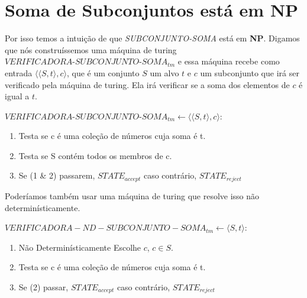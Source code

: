 \documentclass[12pt, a4paper]{article}
\begin{document}
\section{Soma de Subconjuntos está em \textbf{NP}}

Por isso temos a intuição de que \textit{SUBCONJUNTO-SOMA} está em \textbf{NP}. Digamos que nós construíssemos uma máquina de turing $\textit{VERIFICADORA-SUBCONJUNTO-SOMA}_{tm}$ e essa máquina recebe como entrada $\langle \langle S, t \rangle , c \rangle$, que é um conjunto $S$ um alvo $t$ e $c$ um subconjunto que irá ser verificado pela máquina de turing. Ela irá verificar se a soma dos elementos de $c$ é igual a $t$.

$\textit{VERIFICADORA-SUBCONJUNTO-SOMA}_{tm} \leftarrow \langle \langle S, t \rangle , c \rangle$:

\begin{enumerate}
  \item Testa se c é uma coleção de números cuja soma é t.
  \item Testa se S contém todos os membros de c.
  \item Se (1 \& 2) passarem, $STATE_{accept}$ caso  contrário, $STATE_{reject}$
\end{enumerate}

\pagebreak

Poderíamos também usar uma máquina de turing que resolve isso não determinísticamente. \cite{sipser06}

$VERIFICADORA-ND-SUBCONJUNTO-SOMA_{tm} \leftarrow \langle S, t \rangle$:

\begin{enumerate}
  \item Não Determinísticamente Escolhe $c$, $c \in S$.
  \item Testa se c é uma coleção de números cuja soma é t.
  \item Se (2) passar, $STATE_{accept}$ caso  contrário, $STATE_{reject}$ 
\end{enumerate}
\end{document}
